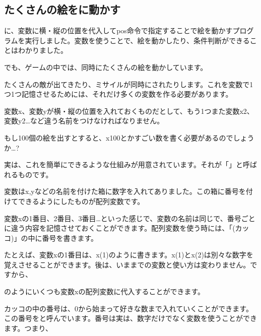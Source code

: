 \newpage
\subsection{たくさんの絵をに動かす}

に、変数に横・縦の位置を代入してpos命令で指定することで絵を動かすプログラムを実行しました。変数を使うことで、絵を動かしたり、条件判断ができることはわかりました。

でも、ゲームの中では、同時にたくさんの絵を動かしています。

たくさんの敵が出てきたり、ミサイルが同時にされたりします。これを変数で1つ1つ記憶させるためには、それだけ多くの変数を作る必要があります。

変数x、変数yが横・縦の位置を入れておくものだとして、もう1つまた変数x2、変数y2…など違う名前をつけなければなりません。

もし100個の絵を出すとすると、x100とかすごい数を書く必要があるのでしょうか…?


実は、これを簡単にできるような仕組みが用意されています。それが「」と呼ばれるものです。

変数はx,yなどの名前を付けた箱に数字を入れてありました。この箱に番号を付けてできるようにしたものが配列変数です。

変数xの1番目、2番目、3番目…といった感じで、変数の名前は同じで、番号ごとに違う内容を記憶させておくことができます。配列変数を使う時には、「(カッコ)」の中に番号を書きます。


\begin{description}
    \item {}
\end{description}

たとえば、変数xの1番目は、x(1)のように書きます。x(1)とx(2)は別々な数字を覚えさせることができます。後は、いままでの変数と使い方は変わりません。ですから、



\begin{description}
    \item {}
    \item {}
    \item {}
\end{description}


のようにいくつも変数xの配列変数に代入することができます。

カッコの中の番号は、0から始まって好きな数まで入れていくことができます。この番号をと呼んでいます。番号は実は、数字だけでなく変数を使うことができます。つまり、

